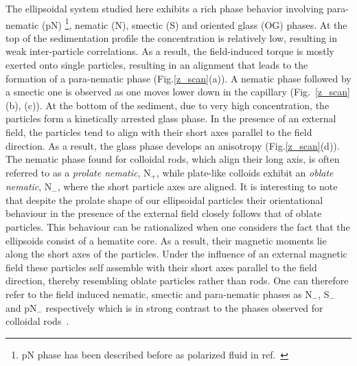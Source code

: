 \documentclass[aps,prl,preprint,superscriptaddress]{revtex4-1}
\begin{document}
The ellipsoidal system studied here exhibits a rich phase behavior involving para-nematic (pN) \footnote{pN phase has been described before as polarized fluid in ref.~\cite{martchenko2016anisotropic}}, nematic (N), smectic (S) and oriented glass (OG) phases. At the top of the sedimentation profile the concentration is relatively low, resulting in weak inter-particle correlations. As a result, the field-induced torque is mostly exerted onto single particles, resulting in an alignment that leads to the formation of a para-nematic phase (Fig.\ref{z_scan}(a)). A nematic phase followed by a smectic one is observed as one moves lower down in the capillary (Fig.~\ref{z_scan}(b), (c)). At the bottom of the sediment, due to very high concentration, the particles form a kinetically arrested glass phase. In the presence of an external field, the particles tend to align with their short axes parallel to the field direction. As a result, the glass phase develops an anisotropy (Fig.\ref{z_scan}(d)). The nematic phase found for colloidal rods, which align their long axis, is often referred to as a \emph{prolate nematic}, N$_+$, while plate-like colloids exhibit an \emph{oblate nematic}, N$_-$, where the short particle axes are aligned. It is interesting to note that despite the prolate shape of our ellipsoidal particles their orientational behaviour in the presence of the external field closely follows that of oblate particles. This behaviour can be rationalized when one considers the fact that the ellipsoids consist of a hematite core. As a result, their magnetic moments lie along the short axes of the particles. Under the influence of an external magnetic field these particles self assemble with their short axes parallel to the field direction, thereby resembling oblate particles rather than rods. One can therefore refer to the field induced nematic, smectic and para-nematic phases as N$_-$, S$_-$ and pN$_-$ respectively which is in strong contrast to the phases observed for colloidal rods~\cite{kuijk2011synthesis}. \par
\end{document}
